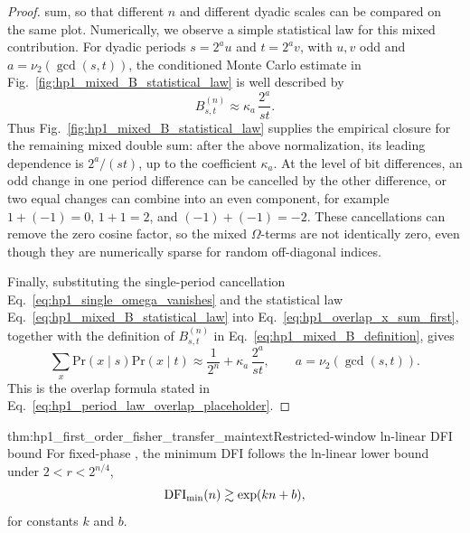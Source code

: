 \begin{proof}
sum, so that different \(n\) and different dyadic scales can be compared on
the same plot.
Numerically, we observe a simple statistical law for this mixed contribution.
For dyadic periods \(s=2^a u\) and \(t=2^a v\), with \(u,v\) odd and
\(a=\nu_2(\gcd(s,t))\), the conditioned Monte Carlo estimate in
Fig.~\ref{fig:hp1_mixed_B_statistical_law} is well described by
\begin{equation}
    B_{s,t}^{(n)}
    \approx
    \kappa_a\,\frac{2^a}{st}.
    \label{eq:hp1_mixed_B_statistical_law}
\end{equation}
Thus Fig.~\ref{fig:hp1_mixed_B_statistical_law} supplies the empirical closure
for the remaining mixed double sum: after the above normalization, its leading
dependence is \(2^a/(st)\), up to the coefficient \(\kappa_a\).
At the level of bit differences, an odd change in one period difference can be
cancelled by the other difference, or two equal changes can combine into an even
component, for example \(1+(-1)=0\), \(1+1=2\), and \((-1)+(-1)=-2\).
These cancellations can remove the zero cosine factor, so the mixed
\(\Omega\)-terms are not identically zero, even though they are numerically
sparse for random off-diagonal indices.

Finally, substituting the single-period cancellation
Eq.~\eqref{eq:hp1_single_omega_vanishes} and the statistical law
Eq.~\eqref{eq:hp1_mixed_B_statistical_law} into
Eq.~\eqref{eq:hp1_overlap_x_sum_first}, together with the definition of
\(B_{s,t}^{(n)}\) in Eq.~\eqref{eq:hp1_mixed_B_definition}, gives
\begin{equation}
    \sum_x \mathrm{Pr}(x\mid s)\mathrm{Pr}(x\mid t)
    \approx
    \frac{1}{2^n}
    +
    \kappa_a\,\frac{2^a}{st},
    \qquad
    a=\nu_2(\gcd(s,t)).
    \label{eq:hp1_overlap_statistical_law}
\end{equation}
This is the overlap formula stated in Eq.~\eqref{eq:hp1_period_law_overlap_placeholder}.
\end{proof}

\begin{theoremrestatement}{thm:hp1_first_order_fisher_transfer_maintext}{Restricted-window ln-linear DFI bound}
For fixed-phase , the minimum DFI follows the ln-linear lower bound
under \(2<r<2^{n/4}\),
\begin{equation}
    \mathrm{DFI}_{\min}(n)
    \gtrsim
    \exp(kn+b),
    \label{eq:hp1_restricted_window_ln_linear_bound_appendix}
\end{equation}
for constants \(k\) and \(b\).
\end{theoremrestatement}

